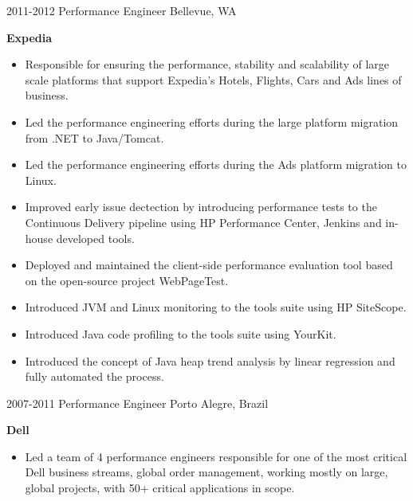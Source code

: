 \begin{entrylist}
    {2011-2012}
    {Performance Engineer}
    {Bellevue, WA}
    {
      \textbf{Expedia}
      \begin{itemize}
        \item Responsible for ensuring the performance, stability and scalability of large scale platforms that support Expedia's Hotels, Flights, Cars and Ads lines of business.
        \item Led the performance engineering efforts during the large platform migration from .NET to Java/Tomcat.
        \item Led the performance engineering efforts during the Ads platform migration to Linux.
        \item Improved early issue dectection by introducing performance tests to the Continuous Delivery pipeline using HP Performance Center, Jenkins and in-house developed tools.
        \item Deployed and maintained the client-side performance evaluation tool based on the open-source project WebPageTest.
        \item Introduced JVM and Linux monitoring to the tools suite using HP SiteScope.
        \item Introduced Java code profiling to the tools suite using YourKit.
        \item Introduced the concept of Java heap trend analysis by linear regression and fully automated the process.
      \end{itemize}
    }
  \entry
    {2007-2011}
    {Performance Engineer}
    {Porto Alegre, Brazil}
    {
      \textbf{Dell}
      \begin{itemize}
        \item Led a team of 4 performance engineers responsible for one of the most critical Dell business streams, global order management, working mostly on large, global projects, with 50+ critical applications in scope.

\end{itemize}}
\end{entrylist}
